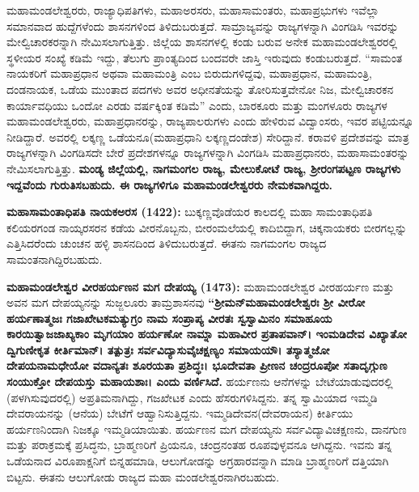 ಮಹಾಮಂಡಲೇಶ್ವರರು, ರಾಜ್ಯಾಧಿಪತಿಗಳು, ಮಹಾಅರಸರು, ಮಹಾಸಾಮಂತರು, ಮಹಾಪ್ರಭುಗಳು ಇವೆಲ್ಲಾ ಸಮಾನವಾದ ಹುದ್ದೆಗಳೆಂದು ಶಾಸನಗಳಿಂದ ತಿಳಿದುಬರುತ್ತದೆ. ಸಾಮ್ರಾಜ್ಯವನ್ನು ರಾಜ್ಯಗಳನ್ನಾಗಿ ವಿಂಗಡಿಸಿ ಇವರನ್ನು ಮೇಲ್ವಿಚಾರಕ\-ರನ್ನಾಗಿ ನೇಮಿಸಲಾಗುತ್ತಿತ್ತು. ಜಿಲ್ಲೆಯ ಶಾಸನಗಳಲ್ಲಿ ಕಂಡು ಬರುವ ಅನೇಕ ಮಹಾಮಂಡಲೇಶ್ವರರಲ್ಲಿ ಸ್ಥಳೀಯರ ಸಂಖ್ಯೆ ಕಡಿಮೆ ಇದ್ದು, ತೆಲುಗು ಪ್ರಾಂತ್ಯದಿಂದ ಬಂದವರೇ ಜಾಸ್ತಿ ಇರುವುದು ಕಂಡುಬರುತ್ತದೆ. “ಸಾಮಂತ ನಾಯಕರಿಗೆ ಮಹಾಪ್ರಧಾನ ಅಥವಾ ಮಹಾಮಂತ್ರಿ ಎಂಬ ಬಿರುದುಗಳಿದ್ದವು, ಮಹಾಪ್ರಧಾನ, ಮಹಾಮಂತ್ರಿ, ದಂಡನಾಯಕ, ಒಡೆಯ ಮುಂತಾದ ಪದಗಳು ಅವರ ಅಧೀನತೆಯನ್ನು ತೋರಿಸುತ್ತವೇನೋ ನಿಜ, ಮೇಲ್ವಿಚಾರಕನ ಕಾರ್ಯಾವಧಿಯು ಒಂದೋ ಎರಡು ವರ್ಷಕ್ಕಿಂತ ಕಡಿಮೆ” ಎಂದು, ಬಾರಕೂರು ಮತ್ತು ಮಂಗಳೂರು ರಾಜ್ಯಗಳ ಮಹಾಮಂಡಲೇಶ್ವರರು, ಮಹಾಪ್ರಧಾನರನ್ನು, ರಾಜ್ಯಪಾಲರುಗಳು ಎಂದು ಹೇಳಿರುವ ವಿದ್ವಾಂಸರು, ಇವರ ಪಟ್ಟಿಯನ್ನೂ ನೀಡಿದ್ದಾರೆ. ಅವರಲ್ಲಿ ಲಕ್ಕಣ್ಣ ಒಡೆಯನೂ(ಮಹಾಪ್ರಧಾನಿ ಲಕ್ಕಣ್ಣದಂಡೇಶ) ಸೇರಿದ್ದಾನೆ. ಕರಾವಳಿ ಪ್ರದೇಶವನ್ನು ಮಾತ್ರ ರಾಜ್ಯಗಳನ್ನಾಗಿ ವಿಂಗಡಿಸದೇ ಬೇರೆ ಪ್ರದೇಶಗಳನ್ನೂ ರಾಜ್ಯಗಳನ್ನಾಗಿ ವಿಂಗಡಿಸಿ ಮಹಾಪ್ರಧಾನರು, ಮಹಾಸಾಮಂತರನ್ನು ನೇಮಿಸಲಾಗುತ್ತಿತ್ತು. \textbf{ಮಂಡ್ಯ ಜಿಲ್ಲೆಯಲ್ಲಿ, ನಾಗಮಂಗಲ ರಾಜ್ಯ, ಮೇಲುಕೋಟೆ ರಾಜ್ಯ, ಶ‍್ರೀರಂಗಪಟ್ಟಣ ರಾಜ್ಯಗಳು ಇದ್ದವೆಂದು ಗುರುತಿಸಬಹುದು. ಈ ರಾಜ್ಯಗಳಿಗೂ ಮಹಾಮಂಡಲೇಶ್ವರರು ನೇಮಕವಾಗಿದ್ದರು.}

\textbf{ಮಹಾಸಾಮಂತಾಧಿಪತಿ ನಾಯಕಅರಸ (1422):} ಬುಕ್ಕಣ್ಣವೊಡೆಯರ ಕಾಲದಲ್ಲಿ ಮಹಾ ಸಾಮಂತಾಧಿಪತಿ ಕಲಿಯರಗಂಡ ನಾಯ್ಕರಸರನ ಕಡೆಯ ವೀರನೊಬ್ಬನು, ಬೀರಂಮಲೆಯಲ್ಲಿ ಕಾದಿಬಿದ್ದಾಗ, ಚಿಕ್ಕನಾಯಕರು ಬೀರಗಲ್ಲನ್ನು ಎತ್ತಿಸಿದರೆಂದು ಚುಂಚನ ಹಳ್ಳಿ ಶಾಸನದಿಂದ ತಿಳಿದುಬರುತ್ತದೆ. ಈತನು ನಾಗಮಂಗಲ ರಾಜ್ಯದ ಸಾಮಂತನಾಗಿದ್ದಿರ\-ಬಹುದು.

\textbf{ಮಹಾಮಂಡಲೇಶ್ವರ ವೀರಹರ್ಯಣನ ಮಗ ದೇಪಯ್ಯ (1473):} ಮಹಾಮಂಡಲೇಶ್ವರ ವೀರಹರ್ಯಣ ಮತ್ತು ಅವನ ಮಗ ದೇಪಯ್ಯನನ್ನು ಸುಜ್ಜಲೂರು ತಾಮ್ರಶಾಸನವು \textbf{“ಶ‍್ರೀಮನ್​ ಮಹಾಮಂಡಲೇಶ್ವರಃ ಶ‍್ರೀ ವೀರೋ ಹರ್ಯಣಾತ್ಮಜಃ ಗಜಾಖೇಟಕಮತ್ಯುಗ್ರಂ ನಾಮ ಸಂಪ್ರಾಪ್ಯ ವೀರತಃ ಸ್ವಸ್ವಾಮಿನಂ ಸಮಾಹೂಯ ಕಾರಯಿತ್ವಾಜಜಾಖ್ಯಕಾಂ ಮೃಗಯಾಂ ಹರ್ಯಣೋ ನಾಮ್ನಾ ಮಹಾವೀರ ಪ್ರತಾಪವಾನ್​। ಇಂಮಡಿದೇವ ವಿಖ್ಯಾತೋ ದ್ವಿಗುಣೀಕೃತ ಕೀರ್ತಿಮಾನ್​। ತತ್ಪುತ್ರಃ ಸರ್ವವಿದ್ಯಾಸುವೈಚಕ್ಷಣ್ಯಂ ಸಮಾಯಯೌ। ತಸ್ಯಾತ್ಮಜೋ ದೇಪಯನಾಮಧೇಯೋ ವದಾನ್ಯತಃ ಶೂರಯತಾ ಪ್ರಶಿದ್ಧಃ। ಭೂದೇವತಾ ಪ್ರೀಣನ ಚಂದ್ರರೂಪೋ ಸತಾದೃಗ್ಗುಣ ಸಂಯುಕ್ತೋ ದೇಪಯಸ್ತು ಮಹಾಯಶಾಃ। ಎಂದು ವರ್ಣಿಸಿದೆ.} ಹರ್ಯಣನು ಆನೆಗಳನ್ನು ಬೇಟೆಯಾಡುವುದರಲ್ಲಿ (ಪಳಗಿಸುವುದರಲ್ಲಿ) ಅಪ್ರತಿಮನಾಗಿದ್ದು, ಗಜಖೇಟಕ ಎಂದು ಹೆಸರು\-ಗಳಿಸಿದ್ದನು. ತನ್ನ ಸ್ವಾಮಿಯಾದ ಇಮ್ಮಡಿ ದೇವರಾಯನನ್ನು (ಆನೆಯ) ಬೇಟೆಗೆ ಆಹ್ವಾನಿಸುತ್ತಿದ್ದನು. ಇಮ್ಮಡಿದೇವನ(ದೇವರಾಯನ) ಕೀರ್ತಿಯು ಹರ್ಯಣನಿಂದಾಗಿ ನಿಜಕ್ಕೂ ಇಮ್ಮಡಿಯಾಯಿತು. ಹರ್ಯಣನ ಮಗ ದೇಪಯ್ಯನು ಸರ್ವವಿದ್ಯಾವಿಚಕ್ಷಣನು, ದಾನಗುಣ ಮತ್ತು ಪರಾಕ್ರಮಕ್ಕೆ ಪ್ರಸಿದ್ಧನು, ಬ್ರಾಹ್ಮಣರಿಗೆ ಪ್ರಿಯನೂ, ಚಂದ್ರನಂತಹ ರೂಪವುಳ್ಳವನೂ ಆಗಿದ್ದನು. ಇವನು ತನ್ನ ಒಡೆಯನಾದ ವಿರೂಪಾಕ್ಷನಿಗೆ ಬಿನ್ನಹಮಾಡಿ, ಆಲುಗೋಡನ್ನು ಅಗ್ರಹಾರವನ್ನಾಗಿ ಮಾಡಿ ಬ್ರಾಹ್ಮಣರಿಗೆ ದತ್ತಿಯಾಗಿ ಬಿಟ್ಟನು. ಈತನು ಆಲುಗೋಡು ರಾಜ್ಯದ ಮಹಾ ಮಂಡಲೇಶ್ವರನಾಗಿರಬಹುದು.

